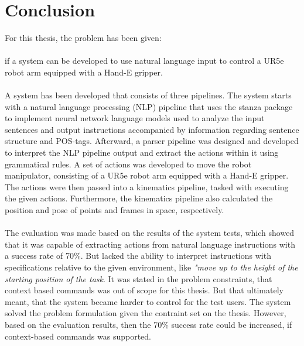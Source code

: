 \chapter{Conclusion} \label{ch:conclusion}
For this thesis, the problem has been given: 
\\\\
if a system can be developed to use natural language input to control a UR5e robot arm equipped with a Hand-E gripper.
\\\\
A system has been developed that consists of three pipelines. The system starts with a natural language processing (NLP) pipeline that uses the stanza package to implement neural network language models used to analyze the input sentences and output instructions accompanied by information regarding sentence structure and POS-tags. Afterward, a parser pipeline was designed and developed to interpret the NLP pipeline output and extract the actions within it using grammatical rules. A set of actions was developed to move the robot manipulator, consisting of a UR5e robot arm equipped with a Hand-E gripper. The actions were then passed into a kinematics pipeline, tasked with executing the given actions. Furthermore, the kinematics pipeline also calculated the position and pose of points and frames in space, respectively.
\\\\
The evaluation was made based on the results of the system tests, which showed that it was capable of extracting actions from natural language instructions with a success rate of 70\%. But lacked the ability to interpret instructions with specifications relative to the given environment, like \textit{"move up to the height of the starting position of the task}. 
It was stated in the problem constraints, that context based commands was out of scope for this thesis. But that ultimately meant, that the system became harder to control for the test users. The system solved the problem formulation given the contraint set on the thesis. However, based on the evaluation results, then the 70\% success rate could be increased, if context-based commands was supported.
